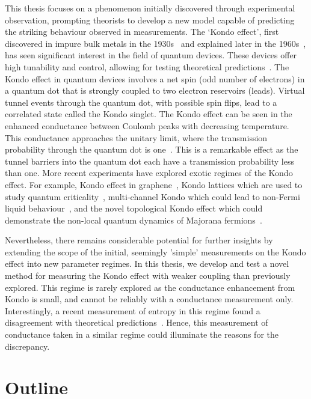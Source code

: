 This thesis focuses on a phenomenon initially discovered through experimental observation, prompting theorists to develop a new model capable of predicting the striking behaviour observed in measurements. The `Kondo effect', first discovered in impure bulk metals in the 1930s~\cite{de_haas} and explained later in the 1960s~\cite{jun_kondo}, has seen significant interest in the field of quantum devices. These devices offer high tunability and control, allowing for testing theoretical predictions~\cite{costi_kondo_mv_eo_regime}. 
The Kondo effect in quantum devices involves a net spin (odd number of electrons) in a quantum dot that is strongly coupled to two electron reservoirs (leads). Virtual tunnel events through the quantum dot, with possible spin flips, lead to a correlated state called the Kondo singlet. The Kondo effect can be seen in the enhanced conductance between Coulomb peaks with decreasing temperature. This conductance approaches the unitary limit, where the transmission probability through the quantum dot is one~\cite{kondo_unitary, kondo_unitary_theory, yigal_kondo}. This is a remarkable effect as the tunnel barriers into the quantum dot each have a transmission probability less than one. More recent experiments have explored exotic regimes of the Kondo effect. For example, Kondo effect in graphene~\cite{kondo_graphene}, Kondo lattices which are used to study quantum criticality~\cite{kondolattice}, multi-channel Kondo which could lead to non-Fermi liquid
behaviour~\cite{potok_2ck, iftikhar_2ck, kirchner_2ck}, and the novel topological Kondo effect which could demonstrate the non-local quantum dynamics of Majorana fermions~\cite{topological_kondo_majorana, topological_kondo, kondo_topological}.

Nevertheless, there remains considerable potential for further insights by extending the scope of the initial, seemingly 'simple' measurements on the Kondo effect into new parameter regimes. In this thesis, we develop and test a novel method for measuring the Kondo effect with weaker coupling than previously explored. This regime is rarely explored as the conductance enhancement from Kondo is small, and cannot be reliably with a conductance measurement only. Interestingly, a recent measurement of entropy in this regime found a disagreement with theoretical predictions~\cite{child_strong}. Hence, this measurement of conductance taken in a similar regime could illuminate the reasons for the discrepancy.




\section{Outline}


